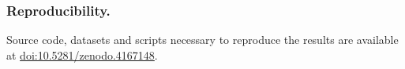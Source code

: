 \documentclass[sigconf,dvipsnames]{acmart}
\newcommand{\supplement}{\href{http://doi.org/10.5281/zenodo.4167148}{doi:10.5281/zenodo.4167148}}
\begin{document}
\subsubsection{Reproducibility.} Source code, datasets and scripts necessary to reproduce the results are available at \supplement.
%


\end{document}
